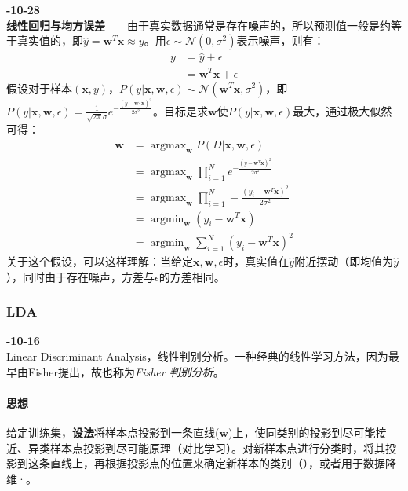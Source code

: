 \textbf{-10-28}\\
\textbf{线性回归与均方误差}\ \ \ \
由于真实数据通常是存在噪声的，所以预测值一般是约等于真实值的，即$\hat{y} = \boldsymbol{w}^T \boldsymbol{x} \approx y$。用$\epsilon \sim \mathcal{N}(0, \sigma^2)$表示噪声，则有：
\begin{align}
	y &= \hat{y} + \epsilon \nonumber \\
	  &= \boldsymbol{w}^T \boldsymbol{x} + \epsilon 	\nonumber
\end{align}
假设对于样本$(\boldsymbol{x}, y)$，$P(y | \boldsymbol{x}, \boldsymbol{w}, \epsilon) \sim \mathcal{N}(\boldsymbol{w}^T \boldsymbol{x}, \sigma^2)$，即$P(y | \boldsymbol{x}, \boldsymbol{w}, \epsilon) = \frac{1}{\sqrt{2\pi} \sigma} e^{-\frac{(y - \boldsymbol{w}^T \boldsymbol{x})^2}{2 \sigma^2}}$。目标是求$\boldsymbol{w}$使$P(y | \boldsymbol{x}, \boldsymbol{w}, \epsilon)$最大，通过极大似然可得：
\begin{align}
	\boldsymbol{w} &= \mathop{argmax}_{\boldsymbol{w}} P(D | \boldsymbol{x}, \boldsymbol{w}, \epsilon) \nonumber \\
		&= \mathop{argmax}_{\boldsymbol{w}} \prod_{i=1}^N e^{-\frac{(y - \boldsymbol{w}^T \boldsymbol{x})^2}{2 \sigma^2}} \nonumber \nonumber \\
		&= \mathop{argmax}_{\boldsymbol{w}} \prod_{i=1}^N -\frac{(y_i - \boldsymbol{w}^T \boldsymbol{x})^2}{2 \sigma^2} \nonumber \\
		&= \mathop{argmin}_{\boldsymbol{w}} (y_i - \boldsymbol{w}^T \boldsymbol{x}) \nonumber \\
		&= \mathop{argmin}_{\boldsymbol{w}} \sum_{i=1}^N (y_i - \boldsymbol{w}^T \boldsymbol{x})^2  \nonumber
\end{align}
关于这个假设，可以这样理解：当给定$\boldsymbol{x}, \boldsymbol{w}, \epsilon$时，真实值在$\hat{y}$附近摆动（即均值为$\hat{y}$），同时由于存在噪声，方差与$\epsilon$的方差相同。

\subsubsection{LDA}
\textbf{-10-16}\\
Linear Discriminant Analysis，线性判别分析。一种经典的线性学习方法，因为最早由Fisher提出，故也称为\textit{Fisher 判别分析}。

\paragraph{思想}给定训练集，\textbf{设法}将样本点投影到一条直线($\boldsymbol{w}$)上，使同类别的投影到尽可能接近、异类样本点投影到尽可能原理（对比学习）。对新样本点进行分类时，将其投影到这条直线上，再根据投影点的位置来确定新样本的类别（），或者用于数据降维·。


